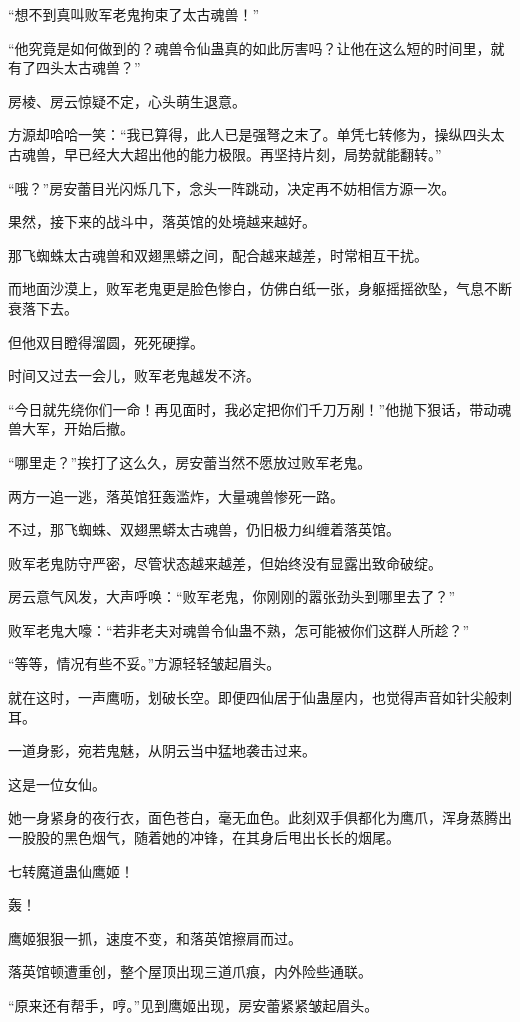\begin{this_body}
“想不到真叫败军老鬼拘束了太古魂兽！”

“他究竟是如何做到的？魂兽令仙蛊真的如此厉害吗？让他在这么短的时间里，就有了四头太古魂兽？”

房棱、房云惊疑不定，心头萌生退意。

方源却哈哈一笑：“我已算得，此人已是强弩之末了。单凭七转修为，操纵四头太古魂兽，早已经大大超出他的能力极限。再坚持片刻，局势就能翻转。”

“哦？”房安蕾目光闪烁几下，念头一阵跳动，决定再不妨相信方源一次。

果然，接下来的战斗中，落英馆的处境越来越好。

那飞蜘蛛太古魂兽和双翅黑蟒之间，配合越来越差，时常相互干扰。

而地面沙漠上，败军老鬼更是脸色惨白，仿佛白纸一张，身躯摇摇欲坠，气息不断衰落下去。

但他双目瞪得溜圆，死死硬撑。

时间又过去一会儿，败军老鬼越发不济。

“今日就先绕你们一命！再见面时，我必定把你们千刀万剐！”他抛下狠话，带动魂兽大军，开始后撤。

“哪里走？”挨打了这么久，房安蕾当然不愿放过败军老鬼。

两方一追一逃，落英馆狂轰滥炸，大量魂兽惨死一路。

不过，那飞蜘蛛、双翅黑蟒太古魂兽，仍旧极力纠缠着落英馆。

败军老鬼防守严密，尽管状态越来越差，但始终没有显露出致命破绽。

房云意气风发，大声呼唤：“败军老鬼，你刚刚的嚣张劲头到哪里去了？”

败军老鬼大嚎：“若非老夫对魂兽令仙蛊不熟，怎可能被你们这群人所趁？”

“等等，情况有些不妥。”方源轻轻皱起眉头。

就在这时，一声鹰呖，划破长空。即便四仙居于仙蛊屋内，也觉得声音如针尖般刺耳。

一道身影，宛若鬼魅，从阴云当中猛地袭击过来。

这是一位女仙。

她一身紧身的夜行衣，面色苍白，毫无血色。此刻双手俱都化为鹰爪，浑身蒸腾出一股股的黑色烟气，随着她的冲锋，在其身后甩出长长的烟尾。

七转魔道蛊仙鹰姬！

轰！

鹰姬狠狠一抓，速度不变，和落英馆擦肩而过。

落英馆顿遭重创，整个屋顶出现三道爪痕，内外险些通联。

“原来还有帮手，哼。”见到鹰姬出现，房安蕾紧紧皱起眉头。


\end{this_body}
